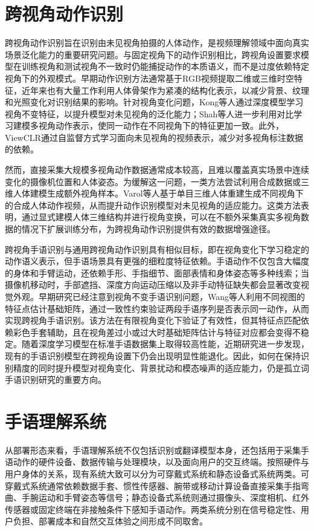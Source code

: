 \section{跨视角动作识别}


跨视角动作识别旨在识别由未见视角拍摄的人体动作，是视频理解领域中面向真实场景泛化能力的重要研究问题。与固定视角下的动作识别相比，跨视角设置要求模型在训练视角和测试视角不一致时仍能捕捉动作的本质语义，而不是过度依赖特定视角下的外观模式。早期动作识别方法通常基于RGB视频提取二维或三维时空特征，近年来也有大量工作利用人体骨架作为紧凑的结构化表示，以减少背景、纹理和光照变化对识别结果的影响。针对视角变化问题，Kong等人通过深度模型学习视角不变特征，以提升模型对未见视角的泛化能力\citep{kong2017deeply}；Shah等人进一步利用对比学习建模多视角动作表示，使同一动作在不同视角下的特征更加一致\citep{shah2023multi}。此外，ViewCLR通过自监督方式学习面向未见视角的视频表示，减少对多视角标注数据的依赖\citep{das2023viewclr}。

然而，直接采集大规模多视角动作数据通常成本较高，且难以覆盖真实场景中连续变化的摄像机位置和人体姿态。为缓解这一问题，一类方法尝试利用合成数据或三维人体建模生成额外视角样本。Varol等人基于单目三维人体重建生成不同视角下的合成人体动作视频，从而提升动作识别模型对未见视角的适应能力\citep{varol2021synthetic}。这类方法表明，通过显式建模人体三维结构并进行视角变换，可以在不额外采集真实多视角数据的情况下扩展训练分布，为跨视角动作识别提供有效的数据增强途径。

跨视角手语识别与通用跨视角动作识别具有相似目标，即在视角变化下学习稳定的动作语义表示，但手语场景具有更强的细粒度特征依赖。手语动作不仅包含大幅度的身体和手臂运动，还依赖手形、手指细节、面部表情和身体姿态等多种线索；当摄像机移动时，手部遮挡、深度方向运动压缩以及非手动特征缺失都会显著改变视觉外观。早期研究已经注意到视角不变手语识别问题，Wang等人利用不同视图的特征点估计基础矩阵，通过一致性约束验证两段手语序列是否表示同一动作，从而实现跨视角手语识别\citep{wang2007viewpoint}。该方法在有限视角变化下验证了有效性，但其特征点匹配依赖彩色手套辅助，且在视角差过小或过大时基础矩阵估计与特征对应都会变得不稳定。随着深度学习模型在标准手语数据集上取得较高性能，近期研究进一步发现，现有的手语识别模型在跨视角设置下仍会出现明显性能退化\citep{shen2024mm}。因此，如何在保持识别精度的同时提升模型对视角变化、背景扰动和模态噪声的适应能力，仍是孤立词手语识别研究的重要方向。

\section{手语理解系统}


从部署形态来看，手语理解系统不仅包括识别或翻译模型本身，还包括用于采集手语动作的硬件设备、数据传输与处理模块，以及面向用户的交互终端。按照硬件与用户身体的关系，现有系统大致可以分为可穿戴式系统和静态设备式系统两类。可穿戴式系统通常依赖数据手套、惯性传感器、腕带或移动计算设备直接采集手指弯曲、手腕运动和手臂姿态等信号；静态设备式系统则通过摄像头、深度相机、红外传感器或固定终端在非接触条件下感知手语动作。两类系统分别在信号稳定性、用户负担、部署成本和自然交互体验之间形成不同取舍。

